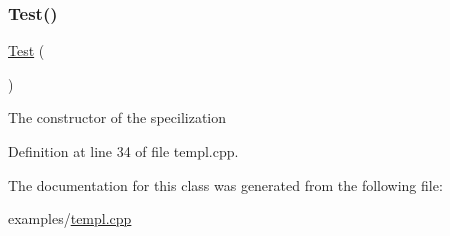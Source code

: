 \subsubsection{\texorpdfstring{Test()}{Test()}}
{\footnotesize\ttfamily \hyperlink{class_test}{Test} (\begin{DoxyParamCaption}{ }\end{DoxyParamCaption})}

The constructor of the specilization 

Definition at line 34 of file templ.\+cpp.



The documentation for this class was generated from the following file\+:\begin{DoxyCompactItemize}
\item 
examples/\hyperlink{templ_8cpp}{templ.\+cpp}\end{DoxyCompactItemize}

